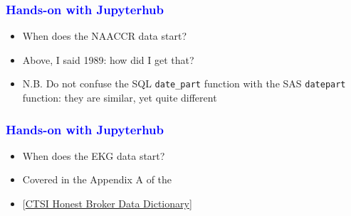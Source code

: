 \documentclass[11pt,pdftex,dvipsnames,usenames]{beamer}
\begin{document}
\begin{frame}[fragile]\frametitle{\bf\textcolor{blue}{Hands-on with Jupyterhub}}
\begin{itemize}
\item When does the NAACCR data start?
\item Above, I said 1989: how did I get that?
\item N.B. Do not confuse the SQL \texttt{date\_part} function with 
the SAS \texttt{datepart} function: they are similar, yet quite different
\end{itemize}

\end{frame}

\begin{frame}[fragile]\frametitle{\bf\textcolor{blue}{Hands-on with Jupyterhub}}
\begin{itemize}
\item When does the EKG data start?
\item Covered in the Appendix A of the 
\item \textcolor{PineGreen}{[\href{https://ctri.mcw.edu/wp-content/uploads/CTSI-Honest-Broker-Data-Dictionary.pdf}{CTSI Honest Broker Data Dictionary}]}
\end{itemize}

\end{frame}
\end{document}
